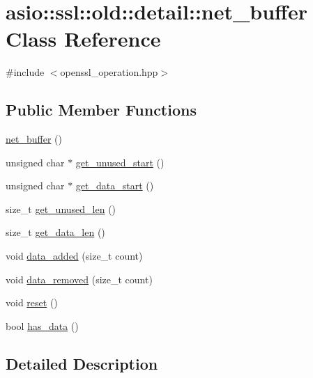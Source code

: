 \hypertarget{classasio_1_1ssl_1_1old_1_1detail_1_1net__buffer}{}\section{asio\+:\+:ssl\+:\+:old\+:\+:detail\+:\+:net\+\_\+buffer Class Reference}
\label{classasio_1_1ssl_1_1old_1_1detail_1_1net__buffer}


{\ttfamily \#include $<$openssl\+\_\+operation.\+hpp$>$}

\subsection*{Public Member Functions}
\begin{DoxyCompactItemize}
\item 
\hyperlink{classasio_1_1ssl_1_1old_1_1detail_1_1net__buffer_a6da947176cc6f4c5d3adc0cb5afcf0c6}{net\+\_\+buffer} ()
\item 
unsigned char $\ast$ \hyperlink{classasio_1_1ssl_1_1old_1_1detail_1_1net__buffer_a7f787b0d5026682f0ac19e2c720f46f9}{get\+\_\+unused\+\_\+start} ()
\item 
unsigned char $\ast$ \hyperlink{classasio_1_1ssl_1_1old_1_1detail_1_1net__buffer_a42007ac573f830dba87b5a5c959764ca}{get\+\_\+data\+\_\+start} ()
\item 
size\+\_\+t \hyperlink{classasio_1_1ssl_1_1old_1_1detail_1_1net__buffer_ac2065ce48fb54ff75a54de072403f713}{get\+\_\+unused\+\_\+len} ()
\item 
size\+\_\+t \hyperlink{classasio_1_1ssl_1_1old_1_1detail_1_1net__buffer_a80b046a5e89d5e22cfdc93db79b48990}{get\+\_\+data\+\_\+len} ()
\item 
void \hyperlink{classasio_1_1ssl_1_1old_1_1detail_1_1net__buffer_aadb568802e90948548f6b8c2d1cce75f}{data\+\_\+added} (size\+\_\+t count)
\item 
void \hyperlink{classasio_1_1ssl_1_1old_1_1detail_1_1net__buffer_ada43bd0574e85e377c9ad4745b2a544d}{data\+\_\+removed} (size\+\_\+t count)
\item 
void \hyperlink{classasio_1_1ssl_1_1old_1_1detail_1_1net__buffer_ad1501336bc3110554e1aea7dd8bc945e}{reset} ()
\item 
bool \hyperlink{classasio_1_1ssl_1_1old_1_1detail_1_1net__buffer_a64d391edf5919bec28cf001bd990c62f}{has\+\_\+data} ()
\end{DoxyCompactItemize}


\subsection{Detailed Description}


